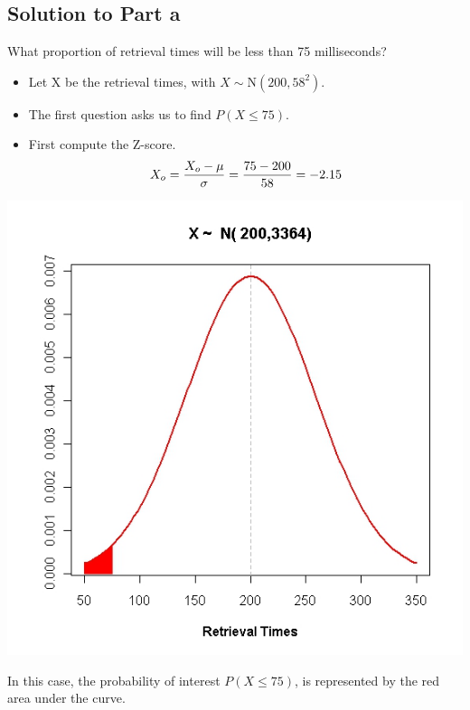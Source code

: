 \documentclass[a4paper,12pt]{article}
\begin{document}
	\subsection*{Solution to Part a}
	What proportion of retrieval times will be less than 75 milliseconds?\\ \bigskip
	
	\begin{itemize}
		\item Let X be the retrieval times, with $X \sim \mbox{N}(200,58^2)$.\\
		\item The first question asks us to find $P( X \leq 75)$. \\
		\item First compute the Z-score.
		\[ X_o =  {X_o - \mu \over \sigma} = {75 - 200 \over 58}  = -2.15 \]
	\end{itemize}

	

	
	\begin{center}
		\includegraphics[scale=0.40]{images/5BNormal2}
	\end{center}
	
\noindent In this case, the probability of interest $P(X\leq 75)$, is represented by the red area under the curve.
	
\end{document}
